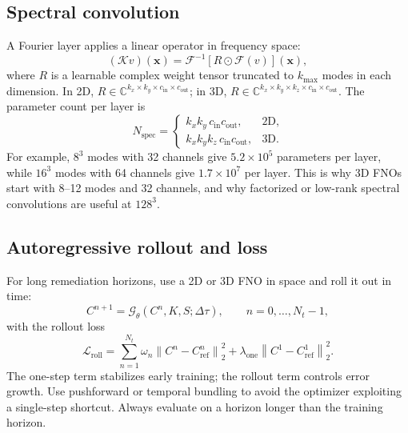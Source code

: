 \documentclass[11pt]{article}
\newcommand{\LL}{\mathcal{L}}
\newcommand{\xx}{\mathbf{x}}
\newcommand{\norm}[1]{\left\lVert #1 \right\rVert}
\begin{document}
\subsection{Spectral convolution}

A Fourier layer applies a linear operator in frequency space:
\begin{equation}
\label{eq:spectral}
(\mathcal{K}v)(\xx)=\mathcal{F}^{-1}\!\left[
R\odot\mathcal{F}(v)\right](\xx),
\end{equation}
where $R$ is a learnable complex weight tensor truncated to $k_{\max}$ modes in
each dimension.  In 2D, $R\in\mathbb{C}^{k_x\times k_y\times c_{\mathrm{in}}
\times c_{\mathrm{out}}}$; in 3D,
$R\in\mathbb{C}^{k_x\times k_y\times k_z\times c_{\mathrm{in}}\times
c_{\mathrm{out}}}$.  The parameter count per layer is
\begin{equation}
\label{eq:params}
N_{\mathrm{spec}}=
\begin{cases}
k_xk_y\,c_{\mathrm{in}}c_{\mathrm{out}}, & \text{2D},\\[2pt]
k_xk_yk_z\,c_{\mathrm{in}}c_{\mathrm{out}}, & \text{3D}.
\end{cases}
\end{equation}
For example, $8^3$ modes with 32 channels give $5.2\times10^5$ parameters per
layer, while $16^3$ modes with 64 channels give $1.7\times10^7$ per layer.
This is why 3D FNOs start with 8--12 modes and 32 channels, and why factorized
or low-rank spectral convolutions are useful at $128^3$.

\subsection{Autoregressive rollout and loss}

For long remediation horizons, use a 2D or 3D FNO in space and roll it out in
time:
\begin{equation}
\label{eq:rollout}
C^{n+1}=\mathcal{G}_\theta(C^n,K,S;\Delta\tau),
\qquad n=0,\dots,N_t-1,
\end{equation}
with the rollout loss
\begin{equation}
\label{eq:rollloss}
\LL_{\mathrm{roll}}=\sum_{n=1}^{N_t}\omega_n
\norm{C^n-C^n_{\mathrm{ref}}}_2^2
+\lambda_{\mathrm{one}}\norm{C^1-C^1_{\mathrm{ref}}}_2^2 .
\end{equation}
The one-step term stabilizes early training; the rollout term controls error
growth.  Use pushforward or temporal bundling to avoid the optimizer exploiting
a single-step shortcut.  Always evaluate on a horizon longer than the training
horizon.
\end{document}
